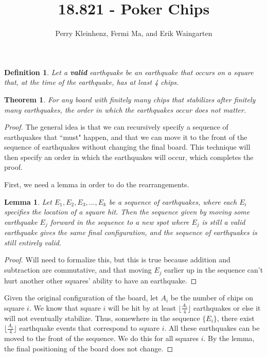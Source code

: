 \documentclass[11pt]{article}
\author{Perry Kleinhenz, Fermi Ma, and Erik Waingarten}
\title{18.821 - Poker Chips}
\newtheorem{theorem}{Theorem}
\newtheorem{lemma}{Lemma}
\newtheorem{definition}{Definition}
\begin{document}
         
\maketitle

\begin{definition}
Let a \textbf{valid} earthquake be an earthquake that occurs on a square that, at the time of the earthquake, has at least 4 chips.
\end{definition}
\begin{theorem}
For any board with finitely many chips that stabilizes after finitely many earthquakes, the order in which the earthquakes occur does not matter.
\end{theorem}
\begin{proof}
The general idea is that we can recursively specify a sequence of earthquakes that ``must" happen, and that we can move it to the front of the sequence of earthquakes without changing the final board. This technique will then specify an order in which the earthquakes will occur, which completes the proof.

First, we need a lemma in order to do the rearrangements.

\begin{lemma}
Let $E_1,E_2,E_3,\dots, E_k$ be a sequence of earthquakes, where each $E_i$ specifies the location of a square hit. Then the sequence given by moving some earthquake $E_j$ forward in the sequence to a new spot where $E_j$ is still a valid earthquake gives the same final configuration, and the sequence of earthquakes is still entirely valid.
\end{lemma}
\begin{proof}
Will need to formalize this, but this is true because addition and subtraction are commutative, and that moving $E_j$ earlier up in the sequence can't hurt another other squares' ability to have an earthquake.
\end{proof}

Given the original configuration of the board, let $A_i$ be the number of chips on square $i$. We know that square $i$ will be hit by at least $\lfloor \frac{A_i}{4} \rfloor$ earthquakes or else it will not eventually stabilize. Thus, somewhere in the sequence $\{E_i\}$, there exist $\lfloor \frac{A_i}{4} \rfloor$ earthquake events that correspond to square $i$. All these earthquakes can be moved to the front of the sequence. We do this for all squares $i$. By the lemma, the final positioning of the board does not change.


\end{proof}
\end{document}
